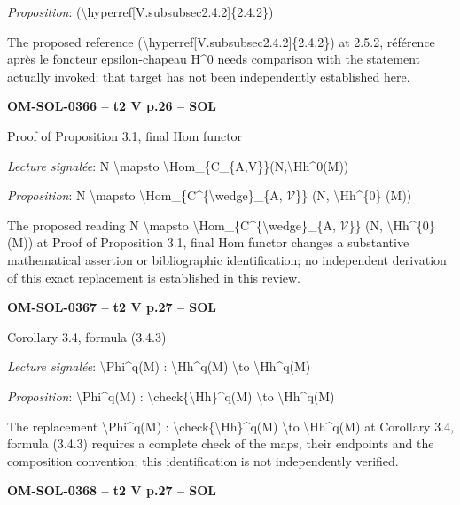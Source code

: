 \emph{Proposition}: (\textbackslash{}hyperref[V.subsubsec2.4.2]\{2.4.2\})\par
The proposed reference (\textbackslash{}hyperref[V.subsubsec2.4.2]\{2.4.2\}) at 2.5.2, référence après le foncteur epsilon-chapeau H\textasciicircum{}0 needs comparison with the statement actually invoked; that target has not been independently established here.\par
\par\noindent\textbf{OM-SOL-0366 -- t2 V p.26 -- SOL}\par
Proof of Proposition 3.1, final Hom functor\par
\emph{Lecture signalée}: N \textbackslash{}mapsto \textbackslash{}Hom\_\{C\_\{A,V\}\}(N,\textbackslash{}Hh\textasciicircum{}0(M))\par
\emph{Proposition}: N \textbackslash{}mapsto \textbackslash{}Hom\_\{C\textasciicircum{}\{\textbackslash{}wedge\}\_\{A, \ensuremath{𝒱}\}\} (N, \textbackslash{}Hh\textasciicircum{}\{0\} (M))\par
The proposed reading N \textbackslash{}mapsto \textbackslash{}Hom\_\{C\textasciicircum{}\{\textbackslash{}wedge\}\_\{A, \ensuremath{𝒱}\}\} (N, \textbackslash{}Hh\textasciicircum{}\{0\} (M)) at Proof of Proposition 3.1, final Hom functor changes a substantive mathematical assertion or bibliographic identification; no independent derivation of this exact replacement is established in this review.\par
\par\noindent\textbf{OM-SOL-0367 -- t2 V p.27 -- SOL}\par
Corollary 3.4, formula (3.4.3)\par
\emph{Lecture signalée}: \textbackslash{}Phi\textasciicircum{}q(M) : \textbackslash{}Hh\textasciicircum{}q(M) \textbackslash{}to \textbackslash{}Hh\textasciicircum{}q(M)\par
\emph{Proposition}: \textbackslash{}Phi\textasciicircum{}q(M) : \textbackslash{}check\{\textbackslash{}Hh\}\textasciicircum{}q(M) \textbackslash{}to \textbackslash{}Hh\textasciicircum{}q(M)\par
The replacement \textbackslash{}Phi\textasciicircum{}q(M) : \textbackslash{}check\{\textbackslash{}Hh\}\textasciicircum{}q(M) \textbackslash{}to \textbackslash{}Hh\textasciicircum{}q(M) at Corollary 3.4, formula (3.4.3) requires a complete check of the maps, their endpoints and the composition convention; this identification is not independently verified.\par
\par\noindent\textbf{OM-SOL-0368 -- t2 V p.27 -- SOL}\par
